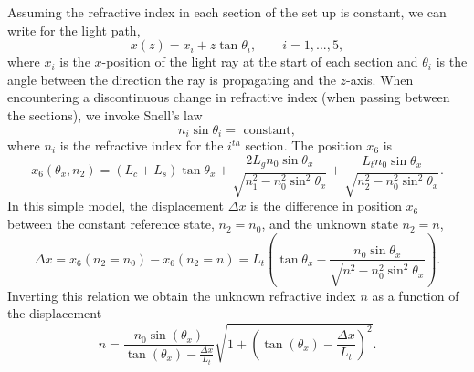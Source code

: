 \documentclass{svjour3}                     %
\begin{document}
Assuming the refractive index in each section of the set up is constant, we can write for the light path,
\begin{equation}
	\label{eq:simpleline}
x(z) = x_i + z \tan \theta_i, \qquad i = 1, ... , 5,
\end{equation}
where $x_i$ is the $x$-position of the light ray at the start of each section and $\theta_i$ is the angle between the direction the ray is propagating and the $z$-axis. When encountering a discontinuous change in refractive index (when passing between the sections), we invoke Snell's law
\begin{equation}
	\label{eq:snellslaw}
n_i \sin \theta_i = \mbox{ constant},
\end{equation}
where $n_i$ is the refractive index for the $i^{th}$ section. The position $x_6$ is
\begin{equation}
\label{eq:simplex6}
x_6 (\theta_x, n_2) =  (L_c+L_s) \tan \theta_x + \frac{2 L_g n_0 \sin \theta_x}{\sqrt{n_1^2 - n_0^2 \sin^2 \theta_x}} + \frac{L_t n_0 \sin \theta_x}{\sqrt{n_2^2 - n_0^2 \sin^2 \theta_x}}.
\end{equation}
In this simple model, the displacement $\Delta x$ is the difference in position $x_6$ between the constant reference state, $n_2 = n_0$, and the unknown state $n_2=n$, 
\begin{equation}
\label{eq:dexcon2}
\Delta x = x_6 (n_2 = n_0) - x_6 (n_2 = n) = L_t \left( \tan \theta_x - \frac{n_0 \sin \theta_x}{\sqrt{n^2 - n_0^2 \sin^2 \theta_x}} \right) .
\end{equation}
Inverting this relation we obtain the unknown refractive index $n$ as a function of the displacement
\begin{equation}
\label{eq:invdexcon2}
n =\frac{n_0 \sin(\theta_x)}{\tan(\theta_x)-\frac{\Delta x}{L_t}} \sqrt{1+\left(\tan(\theta_x)-\frac{\Delta x}{L_t}\right)^2}. %
\end{equation}
\end{document}
